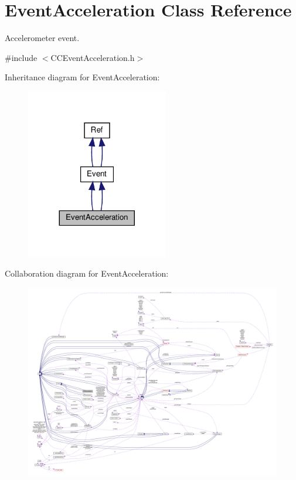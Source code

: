 \hypertarget{classEventAcceleration}{}\section{Event\+Acceleration Class Reference}
\label{classEventAcceleration}


Accelerometer event.  




{\ttfamily \#include $<$C\+C\+Event\+Acceleration.\+h$>$}



Inheritance diagram for Event\+Acceleration\+:
\nopagebreak
\begin{figure}[H]
\begin{center}
\leavevmode
\includegraphics[width=176pt]{classEventAcceleration__inherit__graph}
\end{center}
\end{figure}


Collaboration diagram for Event\+Acceleration\+:
\nopagebreak
\begin{figure}[H]
\begin{center}
\leavevmode
\includegraphics[width=350pt]{classEventAcceleration__coll__graph}
\end{center}
\end{figure}

